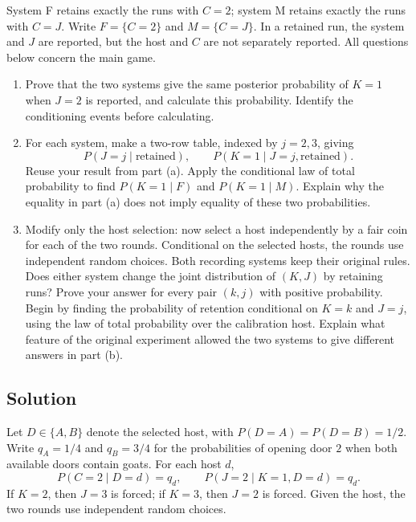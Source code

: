 \documentclass[11pt,a4paper]{article}
\newcommand{\Prob}{P}
\begin{document}
System F retains exactly the runs with $C=2$; system M retains exactly
the runs with $C=J$. Write $F=\{C=2\}$ and $M=\{C=J\}$. In a retained
run, the system and $J$ are reported, but the host and $C$ are not
separately reported. All questions below concern the main game.

\begin{enumerate}
\item Prove that the two systems give the same
posterior probability of $K=1$ when $J=2$ is reported, and calculate
this probability. Identify the conditioning events before calculating.

\item For each system, make a two-row table, indexed
by $j=2,3$, giving
\[
\Prob(J=j\mid\text{retained}),\qquad
\Prob(K=1\mid J=j,\text{retained}).
\]
Reuse your result from part (a). Apply the conditional law of total
probability to find \mbox{$\Prob(K=1\mid F)$} and \mbox{$\Prob(K=1\mid M)$}.
Explain why the equality in part (a) does not imply equality of these
two probabilities.

\item Modify only the host selection: now select a
host independently by a fair coin for each of the two rounds. Conditional on the selected hosts, the rounds use independent random choices. Both
recording systems keep their original rules. Does either system change
the joint distribution of $(K,J)$ by retaining runs? Prove your answer
for every pair $(k,j)$ with positive probability. Begin by finding the
probability of retention conditional on $K=k$ and $J=j$, using the law of
total probability over the calibration host. Explain what feature of
the original experiment allowed the two systems to give different
answers in part (b).
\end{enumerate}

\subsection*{Solution}

Let $D\in\{A,B\}$ denote the selected host, with
$\Prob(D=A)=\Prob(D=B)=1/2$. Write $q_A=1/4$ and $q_B=3/4$ for
the probabilities of opening door $2$ when both available doors contain
goats. For each host $d$,
\[
\Prob(C=2\mid D=d)=q_d,\qquad
\Prob(J=2\mid K=1,D=d)=q_d.
\]
If $K=2$, then $J=3$ is forced; if $K=3$, then $J=2$ is forced.
Given the host, the two rounds use independent random choices.
\end{document}
